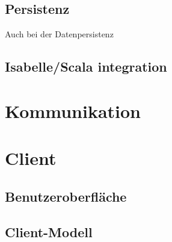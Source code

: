 \subsection{Persistenz}

Auch bei der Datenpersistenz 

\subsection{Isabelle/Scala integration}


\section{Kommunikation}


\section{Client}

\subsection{Benutzeroberfläche}

\subsection{Client-Modell}

\subsection{}